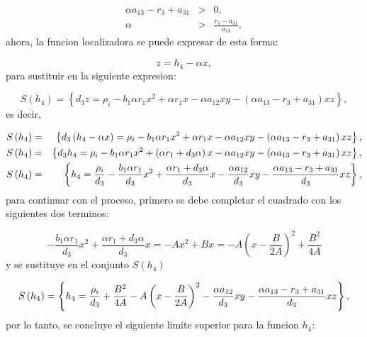 \documentclass[letterpaper,11pt]{article}
\begin{document}
\begin{eqnarray*}
\alpha a_{13}-r_{3}+a_{31} &>&0, \\
\alpha &>&\frac{r_{3}-a_{31}}{a_{13}},
\end{eqnarray*}%
ahora, la funcion localizadora se puede expresar de esta forma:

\begin{equation*}
z=h_{4}-\alpha x,
\end{equation*}%
para sustituir en la siguiente expresion:

\begin{equation*}
S\left( h_{4}\right) =\left\{ d_{3}z=\rho _{i}-b_{1}\alpha r_{1}x^{2}+\alpha
r_{1}x-\alpha a_{12}xy-\left( \alpha a_{13}-r_{3}+a_{31}\right) xz\right\} ,
\end{equation*}%
es decir,

\begin{eqnarray*}
S\left( h_{4}\right) &=&\left\{ d_{3}\left( h_{4}-\alpha x\right) =\rho
_{i}-b_{1}\alpha r_{1}x^{2}+\alpha r_{1}x-\alpha a_{12}xy-\left( \alpha
a_{13}-r_{3}+a_{31}\right) xz\right\} , \\
S\left( h_{4}\right) &=&\left\{ d_{3}h_{4}=\rho _{i}-b_{1}\alpha
r_{1}x^{2}+\left( \alpha r_{1}+d_{3}\alpha \right) x-\alpha a_{12}xy-\left(
\alpha a_{13}-r_{3}+a_{31}\right) xz\right\} , \\
S\left( h_{4}\right) &=&\left\{ h_{4}=\frac{\rho _{i}}{d_{3}}-\frac{%
b_{1}\alpha r_{1}}{d_{3}}x^{2}+\frac{\alpha r_{1}+d_{3}\alpha }{d_{3}}x-%
\frac{\alpha a_{12}}{d_{3}}xy-\frac{\alpha a_{13}-r_{3}+a_{31}}{d_{3}}%
xz\right\} ,
\end{eqnarray*}%
para continuar con el proceso, primero se debe completar el cuadrado con los
siguientes dos terminos:

\begin{equation*}
-\frac{b_{1}\alpha r_{1}}{d_{3}}x^{2}+\frac{\alpha r_{1}+d_{3}\alpha }{d_{3}}%
x=-Ax^{2}+Bx=-A\left( x-\frac{B}{2A}\right) ^{2}+\frac{B^{2}}{4A}
\end{equation*}%
y se sustituye en el conjunto $S\left( h_{4}\right) $

\begin{equation*}
S\left( h_{4}\right) =\left\{ h_{4}=\frac{\rho _{i}}{d_{3}}+\frac{B^{2}}{4A}%
-A\left( x-\frac{B}{2A}\right) ^{2}-\frac{\alpha a_{12}}{d_{3}}xy-\frac{%
\alpha a_{13}-r_{3}+a_{31}}{d_{3}}xz\right\} ,
\end{equation*}%
por lo tanto, se concluye el siguiente limite superior para la funcion $%
h_{4} $:
\end{document}
